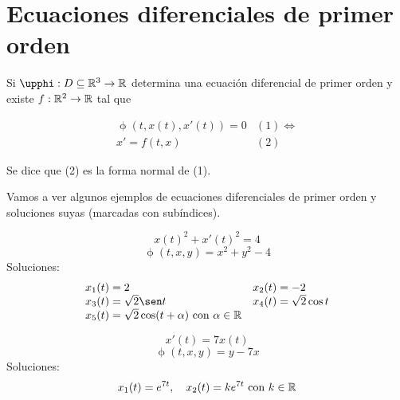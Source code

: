 \section{Ecuaciones diferenciales de primer orden}

\begin{ndef}
  Si $\upphi : D \subseteq \R^{3} \to \R$ determina una ecuación diferencial de primer orden y existe $f : \mathbb{R}^2 \to \mathbb{R}$ tal que

  \[
  \begin{array}{ll}
    \upphi\left(t,x(t),x'(t)\right) = 0 & (1) \iff \\
    x' = f\left(t,x\right) & (2)
  \end{array}
  \]

  Se dice que (2) es la forma normal de (1).
  
\end{ndef}


Vamos a ver algunos ejemplos de ecuaciones diferenciales de primer orden y soluciones suyas (marcadas con subíndices).

\begin{ejemplo}
\[x(t)^2 + x'(t)^2 = 4 \]
\[ \upphi(t,x,y) = x^2+y^2 -4\]
Soluciones:
\[ 
\begin{array}{ll}
  x_1(t) = 2 & x_2(t) = -2 \\
  x_3(t) = \sqrt{2}\sen t & x_4(t) = \sqrt{2}\cos t \\
  x_5(t) = \sqrt{2}\cos(t+\alpha) \text{ con } \alpha\in\R
\end{array}
\]
\end{ejemplo}

\begin{ejemplo}

\[ x'(t) = 7x(t) \]
\[ \upphi(t,x,y) = y - 7x \]
Soluciones:
\[ x_1(t) = e^{7t}, \quad  x_2(t) = ke^{7t} \text{ con } k \in \mathbb{R} \] 


\end{ejemplo}


